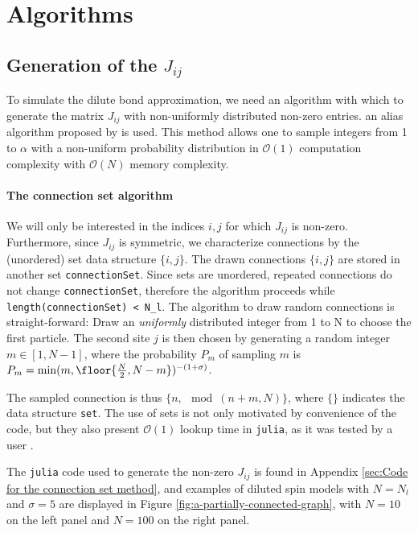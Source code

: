 \section{Algorithms}

\subsection{Generation of the $J_{ij}$}

To simulate the dilute bond approximation, we need an algorithm with which to generate the matrix $J_{ij}$ with non-uniformly distributed non-zero entries.
an alias algorithm proposed by \cite{Walker1974} is used. This method allows one to sample integers from 1 to $\alpha$ with a non-uniform probability distribution in $\mathcal{O}(1)$ computation complexity with $\mathcal{O}(N)$ memory complexity. 

\paragraph{The connection set algorithm}%
\label{sub:The connection set algorithm}

We will only be interested in the indices $i, j$ for which  $J_{ij}$ is non-zero. Furthermore, since $J_{ij}$ is symmetric, we characterize connections by the (unordered) set data structure $\{i, j\}$.
The drawn connections $\{ i, j \} $ are stored in another set \texttt{connectionSet}. Since sets are unordered, repeated connections do not change \texttt{connectionSet}, therefore the algorithm proceeds while \texttt{length(connectionSet) < N\_l}. The algorithm to draw random connections is straight-forward: Draw an \textit{uniformly} distributed integer from 1 to N to choose the first particle. The second site $j$ is then chosen by generating a random integer $m \in [1, N-1]$, where the probability $P_m$ of sampling $m$ is  $P_m = \min(m, \floor{\frac{N}{2}, N - m})^{-(1+\sigma)}$. 

The sampled connection is thus $\{n, \mod(n+m, N)\}$, where $\{\}$ indicates the data structure \texttt{set}. 
The use of sets is not only motivated by convenience of the code, but they also present $\mathcal{O}(1)$ lookup time in \texttt{julia}, as it was tested by a user \cite{setTime}.

The \texttt{julia} code used to generate the non-zero $J_{ij}$ is found in Appendix \ref{sec:Code for the connection set method}, and examples of diluted spin models with $N=N_l$ and $\sigma = 5$ are displayed in Figure \ref{fig:a-partially-connected-graph}, with $N=10$ on the left panel and $N=100$ on the right panel.



